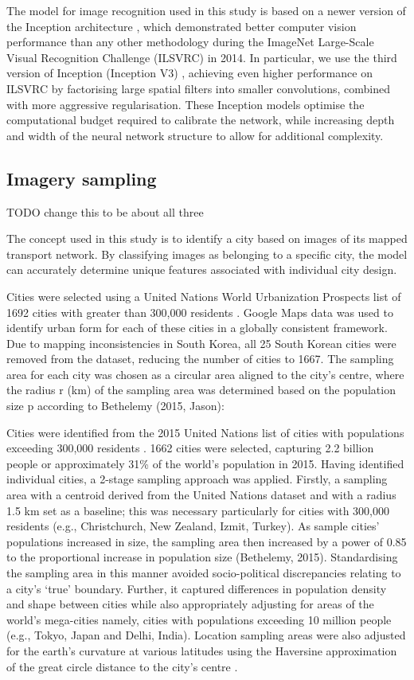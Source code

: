 \documentclass[final,3p,times,authoryear]{elsarticle}
\begin{document}
The model for image recognition used in this study is based on a newer version of the Inception architecture \citep{Szegedy2015}, which demonstrated better computer vision performance than any other methodology during the ImageNet Large-Scale Visual Recognition Challenge (ILSVRC) \citep{Russakovsky2015} in 2014. In particular, we use the third version of Inception (Inception V3) \citep{Szegedy2015a}, achieving even higher performance on ILSVRC by factorising large spatial filters into smaller convolutions, combined with more aggressive regularisation. These Inception models optimise the computational budget required to calibrate the network, while increasing depth and width of the neural network structure to allow for additional complexity.

\subsection{Imagery sampling}\label{sec:methods2}
TODO change this to be about all three

The concept used in this study is to identify a city based on images of its mapped transport network. By classifying images as belonging to a specific city, the model can accurately determine unique features associated with individual city design. 

Cities were selected using a United Nations World Urbanization Prospects list of 1692 cities with greater than 300,000 residents \citep{UN2014}. Google Maps data was used to identify urban form for each of these cities in a globally consistent framework. Due to mapping inconsistencies in South Korea, all 25 South Korean cities were removed from the dataset, reducing the number of cities to 1667. The sampling area for each city was chosen as a circular area aligned to the city’s centre, where the radius r (km) of the sampling area was determined based on the population size p according to Bethelemy (2015, Jason):

Cities were identified from the 2015 United Nations list of cities with populations exceeding 300,000 residents \citep{UN2014}. 1662 cities were selected, capturing 2.2 billion people or approximately 31\% of the world’s population in 2015. Having identified individual cities, a 2-stage sampling approach was applied. Firstly, a sampling area with a centroid derived from the United Nations dataset and with a radius 1.5 km set as a baseline; this was necessary particularly for cities with 300,000 residents (e.g., Christchurch, New Zealand, Izmit, Turkey). As sample cities’ populations increased in size, the sampling area then increased by a power of 0.85 to the proportional increase in population size (Bethelemy, 2015). Standardising the sampling area in this manner avoided socio-political discrepancies relating to a city’s ‘true’ boundary. Further, it captured differences in population density and shape between cities while also appropriately adjusting for areas of the world’s mega-cities namely, cities with populations exceeding 10 million people (e.g., Tokyo, Japan and Delhi, India). Location sampling areas were also adjusted for the earth’s curvature at various latitudes using the Haversine approximation of the great circle distance to the city’s centre \citep{Sinnott1984}. 
\end{document}
